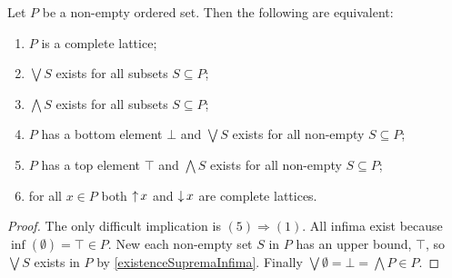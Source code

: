 \begin{proposition} \label{completeLatticeBasic}
Let $P$ be a non-empty ordered set. Then the following are equivalent:
\begin{enumerate}
\item $P$ is a complete lattice;
\item $\bigvee S$ exists for all subsets $S\subseteq P$;
\item $\bigwedge S$ exists for all subsets $S\subseteq P$;
\item $P$ has a bottom element $\bot$ and $\bigvee S$ exists for all non-empty $S\subseteq P$;
\item $P$ has a top element $\top$ and $\bigwedge S$ exists for all non-empty $S\subseteq P$;
\item for all $x\in P$ both $\operatorname{\uparrow} x$ and $\operatorname{\downarrow} x$ are complete lattices.
\end{enumerate}
\end{proposition}
\begin{proof}
The only difficult implication is $(5)\Rightarrow (1)$. All infima exist because $\inf(\emptyset) = \top \in P$. New each non-empty set $S$ in $P$ has an upper bound, $\top$, so $\bigvee S$ exists in $P$ by \ref{existenceSupremaInfima}. Finally $\bigvee \emptyset = \bot = \bigwedge P \in P$.
\end{proof}

